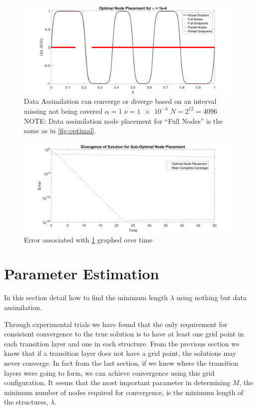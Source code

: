 \documentclass[12pt]{amsart}
\theoremstyle{plain}
\theoremstyle{definition}
\theoremstyle{remark}
\numberwithin{equation}{section} %
\numberwithin{figure}{section}   %
\begin{document}
\begin{figure}
	\centering
	\includegraphics[scale=0.15]{CompleteOptimal.jpg}
	\caption{Data Assimilation can converge or diverge based on an interval missing not being covered $\alpha = 1$ $\nu=\num{1e-4}$ $N = 2^{12}=4096$\\NOTE: Data assimilation node placement for ``Full Nodes'' is the same as in \cref{fig:optimal}.}
	\label{fig:minimumGridFull}
\end{figure}
\begin{figure}
	\centering
	\includegraphics[scale=0.15]{CompleteError.jpg}
	\caption{Error associated with \cref{fig:minimumGridFull} graphed over time}
	\label{fig:minimumGridErrorComplete}
\end{figure}
\section{Parameter Estimation}\label{secNeat1Section}
\noindent
{}
In this section detail how to find the minimum length $\lambda$ using nothing but data assimilation.

Through experimental trials we have found that the only requirement for consistent convergence to the true solution is to have at least one grid point in each transition layer and one in each structure. From the previous section we know that if a transition layer does not have a grid point, the solutions may never converge. In fact from the last section, if we knew where the transition layers were going to form, we can achieve convergence using this grid configuration. It seems that the most important parameter in determining $M$, the minimum number of nodes required for convergence, is the minimum length of the structures, $\lambda$. 
\end{document}
